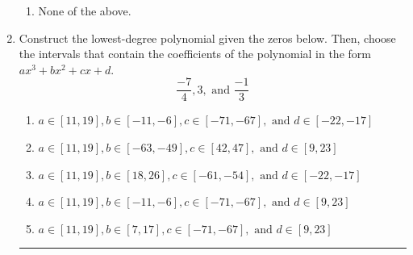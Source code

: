 \documentclass[14pt]{extbook}
\newcommand{\litem}[1]{\item#1\hspace*{-1cm}\rule{\textwidth}{0.4pt}}
\begin{document}
\begin{enumerate}
{\begin{enumerate}[label=\Alph*.]
\item None of the above.
\end{enumerate} }
\litem{
Construct the lowest-degree polynomial given the zeros below. Then, choose the intervals that contain the coefficients of the polynomial in the form $ax^3+bx^2+cx+d$.\[ \frac{-7}{4}, 3, \text{ and } \frac{-1}{3} \]\begin{enumerate}[label=\Alph*.]
\item \( a \in [11, 19], b \in [-11, -6], c \in [-71, -67], \text{ and } d \in [-22, -17] \)
\item \( a \in [11, 19], b \in [-63, -49], c \in [42, 47], \text{ and } d \in [9, 23] \)
\item \( a \in [11, 19], b \in [18, 26], c \in [-61, -54], \text{ and } d \in [-22, -17] \)
\item \( a \in [11, 19], b \in [-11, -6], c \in [-71, -67], \text{ and } d \in [9, 23] \)
\item \( a \in [11, 19], b \in [7, 17], c \in [-71, -67], \text{ and } d \in [9, 23] \)


\end{enumerate}}
\end{enumerate}
\end{document}
